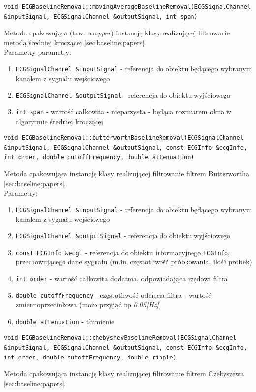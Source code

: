 \documentclass[a4paper, 11pt]{article}
\begin{document}
\begin{lstlisting}
void ECGBaselineRemoval::movingAverageBaselineRemoval(ECGSignalChannel 
&inputSignal, ECGSignalChannel &outputSignal, int span)
\end{lstlisting}
Metoda opakowująca (tzw. \textit{wrapper}) instancję klasy realizującej filtrowanie metodą średniej kroczącej \ref{sec:baseline:papers}. \\
Parametry parametry:
\begin{enumerate}
\item \verb|ECGSignalChannel &inputSignal| - referencja do obiektu będącego wybranym kanałem z sygnału wejściowego
\item \verb|ECGSignalChannel &outputSignal| - referencja do obiektu wyjściowego
\item \verb|int span| - wartość całkowita - nieparzysta - będąca rozmiarem okna w algorytmie średniej kroczącej
\end{enumerate}

\begin{lstlisting}
void ECGBaselineRemoval::butterworthBaselineRemoval(ECGSignalChannel 
&inputSignal, ECGSignalChannel &outputSignal, const ECGInfo &ecgInfo, 
int order, double cutoffFrequency, double attenuation)
\end{lstlisting}
Metoda opakowująca instancję klasy realizującej filtrowanie filtrem Butterwortha \ref{sec:baseline:papers}. \\

Parametry:
\begin{enumerate}
\item \verb|ECGSignalChannel &inputSignal| - referencja do obiektu będącego wybranym kanałem z sygnału wejściowego
\item \verb|ECGSignalChannel &outputSignal| - referencja do obiektu wyjściowego
\item \verb|const ECGInfo &ecgi| - referencja do obiektu informacyjnego \verb|ECGInfo|, przechowującego dane sygnału (m.in. częstotliwość próbkowania, ilość próbek)
\item \verb|int order| - wartość całkowita dodatnia, odpowiadająca rzędowi filtra
\item \verb|double cutoffFrequency| - częstotliwość odcięcia filtra - wartość zmiennoprzecinkowa (może przyjąć np \textit{0.05[Hz]})
\item \verb|double attenuation| - tłumienie 
\end{enumerate}

\begin{lstlisting}
void ECGBaselineRemoval::chebyshevBaselineRemoval(ECGSignalChannel 
&inputSignal, ECGSignalChannel &outputSignal, const ECGInfo &ecgInfo, 
int order, double cutoffFrequency, double ripple)
\end{lstlisting}
Metoda opakowująca instancję klasy realizującej filtrowanie filtrem Czebyszewa \ref{sec:baseline:papers}. \\
\end{document}
